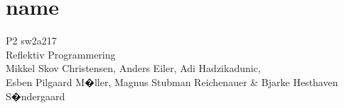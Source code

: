 \section*{name}%
\begin{frame}{}
	\begin{center}
		P2 sw2a217\\
		Reflektiv Programmering\\
		
		\tiny{Mikkel Skov Christensen, Anders Eiler, Adi Hadzikadunic,}\\ \tiny{Esben Pilgaard M�ller, Magnus Stubman Reichenauer \& Bjarke Hesthaven S�ndergaard}
	\end{center}
\end{frame}